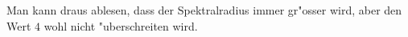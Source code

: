 \begin{loesung}
\begin{center}
\begin{tabular}{|>{$}r<{$}|>{$}c<{$}|>{$}c<{$}|}
\hline
\end{tabular}
\end{center}
Man kann draus ablesen, dass der Spektralradius immer gr"osser wird,
aber den Wert $4$ wohl nicht "uberschreiten wird.
\end{loesung}

